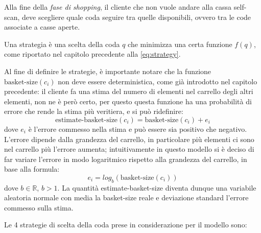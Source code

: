 Alla fine della \textit{fase di shopping}, il cliente che non vuole andare alla cassa self-scan, deve scegliere quale coda seguire tra quelle disponibili, ovvero tra le code associate a casse aperte. 

Una strategia è una scelta della coda $q$ che minimizza una certa funzione $f(q)$, come riportato nel capitolo precedente alla \ref{eq:strategy}. 

Al fine di definire le strategie, è importante notare che la funzione $\text{basket-size}(c_i)$ non deve essere deterministica, come già introdotto nel capitolo precedente: il cliente fa una stima del numero di elementi nel carrello degli altri elementi, non ne è però certo, per questo questa funzione ha una probabilità di errore che rende la stima più veritiera, e si può ridefinire:
\begin{equation}\label{eq:estimate-basket-size}
\text{estimate-basket-size}(c_i) = \text{basket-size}(c_i) + e_i
\end{equation}
dove $e_i$ è l'errore commesso nella stima e può essere sia positivo che negativo. L'errore dipende dalla grandezza del carrello, in particolare più elementi ci sono nel carrello più l'errore aumenta; intuitivamente in questo modello si è deciso di far variare l'errore in modo logaritmico rispetto alla grandezza del carrello, in base alla formula:
\begin{equation}\label{eq:error-basket-size}
e_i = log_b (\text{basket-size}(c_i))
\end{equation}
dove $b \in \mathbb{R}$, $b > 1$. 
La quantità estimate-basket-size diventa dunque una variabile aleatoria normale con media la basket-size reale e deviazione standard l'errore commesso sulla stima.

Le 4 strategie di scelta della coda prese in considerazione per il modello sono:

